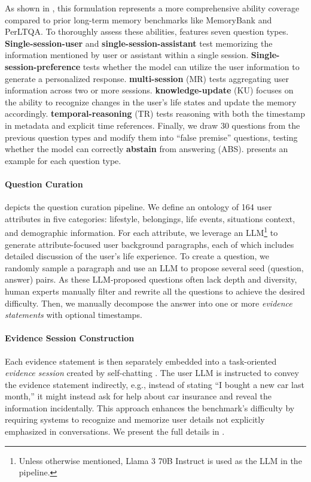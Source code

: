 As shown in , this formulation represents a more comprehensive ability coverage compared to prior long-term memory benchmarks like MemoryBank and PerLTQA. To thoroughly assess these abilities, \BENCHMARK{} features seven question types. \textbf{Single-session-user} and \textbf{single-session-assistant} test memorizing the information mentioned by user or assistant within a single session. \textbf{Single-session-preference} tests whether the model can utilize the user information to generate a personalized response. \textbf{multi-session} (MR) tests aggregating user information across two or more sessions. \textbf{knowledge-update} (KU) focuses on the ability to recognize changes in the user's life states and update the memory accordingly. \textbf{temporal-reasoning} (TR) tests reasoning with both the timestamp in metadata and explicit time references. Finally, we draw 30 questions from the previous question types and modify them into ``false premise'' questions, testing whether the model can correctly \textbf{abstain} from answering (ABS).  presents an example for each question type.

\paragraph{{Question Curation}}  depicts the question curation pipeline. We define an ontology of 164 user attributes in five categories: lifestyle, belongings, life events, situations context, and demographic information. For each attribute, we leverage an LLM\footnote{Unless otherwise mentioned, Llama 3 70B Instruct \citep{dubey2024llama} is used as the LLM in the pipeline.} to generate attribute-focused user background paragraphs, each of which includes detailed discussion of the user's life experience. To create a question, we randomly sample a paragraph and use an LLM to propose several seed (question, answer) pairs. As these LLM-proposed questions often lack depth and diversity, human experts manually filter and rewrite all the questions to achieve the desired difficulty. Then, we manually decompose the answer into one or more \textit{evidence statements} with optional timestamps. 

\paragraph{{Evidence Session Construction}} Each evidence statement is then separately embedded into a task-oriented \textit{evidence session} created by self-chatting \citep{xu-etal-2023-baize}. The user LLM is instructed to convey the evidence statement indirectly, e.g., instead of stating ``I bought a new car last month,'' it might instead ask for help about car insurance and reveal the information incidentally. This approach enhances the benchmark’s difficulty by requiring systems to recognize and memorize user details not explicitly emphasized in conversations. We present the full details in .

